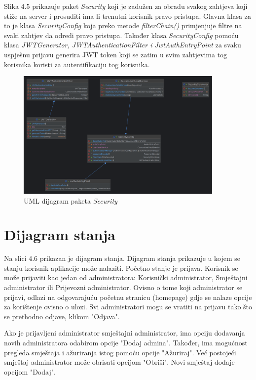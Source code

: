 			Slika 4.5 prikazuje paket \textit{Security} koji je zadužen za obradu svakog zahtjeva koji stiže na server i prosuditi ima li trenutni korisnik pravo pristupa. Glavna klasa za to je klasa \textit{SecurityConfig} koja preko metode \textit{filterChain()} primjenjuje filtre na svaki zahtjev da odredi pravo pristupa. Također klasa \textit{SecurityConfig} pomoću klasa \textit{JWTGenerator, JWTAuthenticationFilter i JwtAuthEntryPoint} za svaku uspješnu prijavu generira JWT token koji se zatim u svim zahtjevima tog korisnika koristi za autentifikaciju tog korisnika.
			
			\begin{figure}[htbp]
				\centering
				\includegraphics[width=0.9\textwidth]{slike/securityUML}
				\caption{UML dijagram paketa \textit{Security}}
				\label{fig:securityUML}
			\end{figure}
			
			
			
			\eject
		
		\section{Dijagram stanja}
			
			
			Na slici 4.6 prikazan je dijagram stanja. Dijagram stanja prikazuje u kojem se stanju korisnik aplikacije može nalaziti. Početno stanje je prijava. Korisnik se može prijaviti kao jedan od administratora: Korisnički administrator, Smještajni administrator ili Prijevozni administrator. Ovisno o tome koji administrator se prijavi, odlazi na odgovarajuću početnu stranicu (homepage) gdje se nalaze opcije za korištenje ovisno o ulozi. Svi administratori mogu se vratiti na prijavu tako što se prethodno odjave, klikom "Odjava".
			
			Ako je prijavljeni administrator smještajni administrator, ima opciju dodavanja novih administratora odabirom opcije "Dodaj admina". Također, ima mogućnost pregleda smještaja i ažuriranja istog pomoću opcije "Ažuriraj". Već postojeći smještaj administrator može obrisati opcijom "Obriši". Novi smještaj dodaje opcijom "Dodaj".
			
